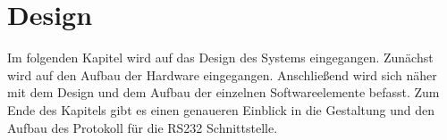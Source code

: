 \chapter{Design}
\label{chapter_Design}

Im folgenden Kapitel wird auf das Design des Systems eingegangen. Zunächst wird auf den Aufbau der Hardware eingegangen. Anschließend wird sich näher mit dem Design und dem Aufbau der einzelnen Softwareelemente befasst. Zum Ende des Kapitels gibt es einen genaueren Einblick in die Gestaltung und den Aufbau des Protokoll für die RS232 Schnittstelle.






\newpage


